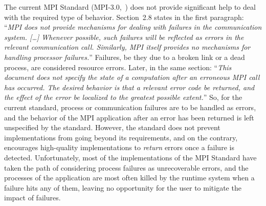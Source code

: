 The current MPI Standard (MPI-3.0,~\cite{MPI30}) does not provide
significant help to deal with the required type of behavior. Section~2.8
states in the first paragraph: ``\emph{MPI does not provide mechanisms
  for dealing with failures in the communication system. [\ldots]
  Whenever possible, such failures will be reflected as errors in the
  relevant communication call. Similarly, MPI itself provides no
  mechanisms for handling processor failures.}'' Failures, be they due
to a broken link or a dead process, are considered  resource
errors. Later, in the same section: ``\emph{This document does not
  specify the state of a computation after an erroneous MPI call has
  occurred. The desired behavior is that a relevant error code be
  returned, and the effect of the error be localized to the greatest
  possible extent.}'' So, for the current standard, process or
communication failures are to be handled as errors, and the behavior
of the MPI application after an error has been returned is left
unspecified by the standard. However, the standard does not prevent
implementations from going beyond its requirements, and on the contrary,
encourages high-quality implementations to \emph{return} errors once a
failure is detected. Unfortunately, most of the implementations of the 
MPI Standard have taken the path of considering process failures as 
unrecoverable errors, and the processes of the application are most 
often killed by the runtime system when a failure hits any of them, 
leaving no opportunity for the user to mitigate the impact of 
failures. 

